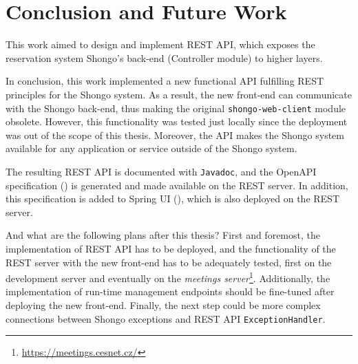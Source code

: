 \chapter{Conclusion and Future Work} \label{cha:conclusion}
This work aimed to design and implement REST API, which exposes the reservation system Shongo's back-end (Controller module) to higher layers.

In conclusion, this work implemented a new functional API fulfilling REST principles for the Shongo system.
As a result, the new front-end \cite{drobnakm} can communicate with the Shongo back-end, thus making the original \texttt{shongo-web-client} module obsolete. However, this functionality was tested just locally since the deployment was out of the scope of this thesis.
Moreover, the API makes the Shongo system available for any application or service outside of the Shongo system.

The resulting REST API is documented with \texttt{Javadoc}, and the OpenAPI specification () is generated and made available on the REST server.
In addition, this specification is added to Spring UI (), which is also deployed on the REST server.

And what are the following plans after this thesis?
First and foremost, the implementation of REST API has to be deployed, and the functionality of the REST server with the new front-end has to be adequately tested, first on the development server and eventually on the \emph{meetings server}\footnote{\url{https://meetings.cesnet.cz/}}.
Additionally, the implementation of run-time management endpoints should be fine-tuned after deploying the new front-end.
Finally, the next step could be more complex connections between Shongo exceptions and REST API \texttt{ExceptionHandler}.
